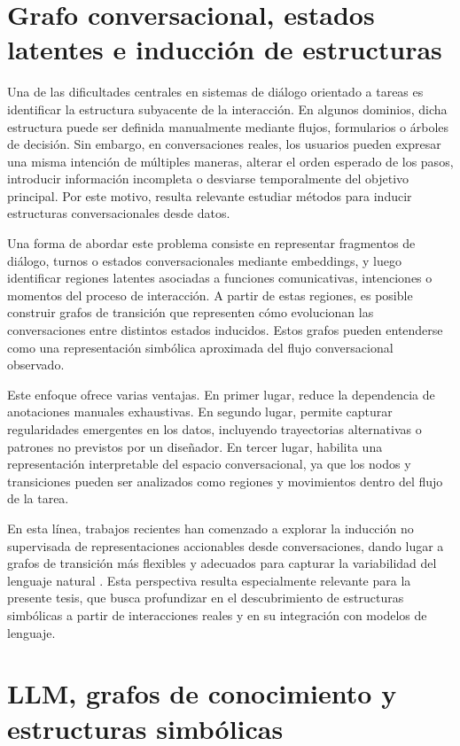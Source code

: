 \section{Grafo conversacional, estados latentes e inducción de estructuras}

Una de las dificultades centrales en sistemas de diálogo orientado a tareas es identificar
la estructura subyacente de la interacción. En algunos dominios, dicha estructura puede
ser definida manualmente mediante flujos, formularios o árboles de decisión. Sin
embargo, en conversaciones reales, los usuarios pueden expresar una misma intención
de múltiples maneras, alterar el orden esperado de los pasos, introducir información
incompleta o desviarse temporalmente del objetivo principal. Por este motivo, resulta
relevante estudiar métodos para inducir estructuras conversacionales desde datos.

Una forma de abordar este problema consiste en representar fragmentos de diálogo,
turnos o estados conversacionales mediante embeddings, y luego identificar regiones
latentes asociadas a funciones comunicativas, intenciones o momentos del proceso de
interacción. A partir de estas regiones, es posible construir grafos de transición que
representen cómo evolucionan las conversaciones entre distintos estados inducidos.
Estos grafos pueden entenderse como una representación simbólica aproximada del
flujo conversacional observado.

Este enfoque ofrece varias ventajas. En primer lugar, reduce la dependencia de
anotaciones manuales exhaustivas. En segundo lugar, permite capturar regularidades
emergentes en los datos, incluyendo trayectorias alternativas o patrones no previstos
por un diseñador. En tercer lugar, habilita una representación interpretable del espacio
conversacional, ya que los nodos y transiciones pueden ser analizados como regiones y
movimientos dentro del flujo de la tarea.

En esta línea, trabajos recientes han comenzado a explorar la inducción no supervisada
de representaciones accionables desde conversaciones, dando lugar a grafos de transición
más flexibles y adecuados para capturar la variabilidad del lenguaje natural
\citep{burdisso2024dialog2flow}. Esta perspectiva resulta especialmente relevante para
la presente tesis, que busca profundizar en el descubrimiento de estructuras simbólicas
a partir de interacciones reales y en su integración con modelos de lenguaje.

\section{LLM, grafos de conocimiento y estructuras simbólicas}


